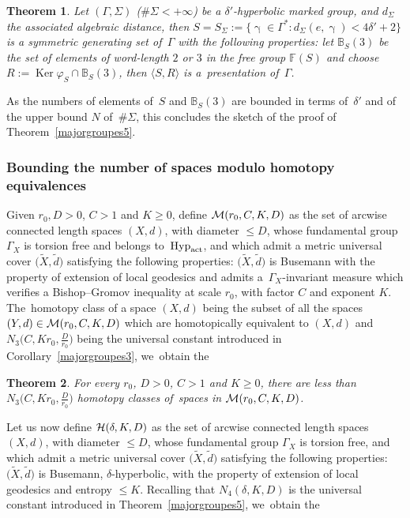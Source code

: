 \documentclass[pdftex]{sigma}
\numberwithin{equation}{section}
\newtheorem{theor}{Theorem}[section]
\newcommand{\Ker}{\operatorname{Ker}}
\newcommand{\g}{\operatorname{\gamma}}
\begin{document}
\begin{itemize}
\begin{theor}%
Let $(\Gamma, \Sigma)$ ($\#\Sigma <+\infty$) be a $\delta'$-hyperbolic marked group, and $d_\Sigma$ the associated algebraic distance,
then $S = S_\Sigma := \{\g \in \Gamma^*\colon d_\Sigma (e, \g) < 4 \delta' + 2 \}$ is a symmetric generating set of~$\Gamma$ with the following properties: let $\mathbb B_S (3)$ be the set of elements of word-length $2$ or $ 3$ in the free group $\mathbb F(S)$
and choose $R := \Ker \varphi_S \cap \mathbb B_S (3)$, then $\langle S, R\rangle$ is a~pre\-sentation of~$\Gamma$.
\end{theor}

As the numbers of elements of~$S$ and $\mathbb B_S (3)$ are bounded in terms of~$\delta'$ and of the upper bound $N$ of~$\# \Sigma$, this concludes the sketch of the proof of Theorem~\ref{majorgroupes5}.
\end{itemize}

\subsubsection{Bounding the number of spaces modulo homotopy equivalences}%

Given $r_0, D >0$, $C > 1$ and $K\ge 0$, define ${\cal M} (r_0, C, K,
D)$ as the set of arcwise connected length spaces $(X,d)$, with diameter $\le D$, whose
fundamental group $\Gamma_X$ is torsion free and belongs to~${\rm Hyp}_{\rm act}$, and which admit a metric universal cover $\big(\widetilde X, \tilde d\big)$
satisfying the following properties: $\big(\widetilde X, \tilde d\big)$ is Busemann with the property of extension of local geodesics and admits a~$\Gamma_X$-invariant
measure which verifies a Bishop--Gromov inequality at scale $r_0$, with factor $C$ and exponent $K$. The~homotopy class of a space $(X,d)$ being the subset
of all the spaces $(Y,d) \in {\cal M} (r_0, C, K, D)$ which are homotopically equivalent to $(X,d)$ and
$N_3 \big(C, K r_0, \frac{D}{r_0}\big)$ being the universal constant introduced in Corollary~\ref{majorgroupes3}, we~obtain the

\begin{theor}\label{boundhomotopies1}
For every $r_0$, $D >0$, $C > 1$ and $K\ge 0$, there are less than $N_3 \big(C, K r_0, \frac{D}{r_0}\big)$ homotopy classes of~spaces in ${\cal M} (r_0, C, K, D)$.
\end{theor}

Let us now define ${\cal H} (\delta, K, D)$ as the set of arcwise connected length spaces $(X,d)$, with diameter $\le D$, whose
fundamental group $\Gamma_X$ is torsion free, and which admit a metric universal cover $\big(\widetilde X, \tilde d\big)$
satisfying the following properties: $\big(\widetilde X, \tilde d\big)$ is Busemann, $\delta$-hyperbolic, with the property of extension of local geodesics and
entropy $\le K$. Recalling that $N_4 \left(\delta, K, D \right)$ is the universal constant introduced in Theorem~\ref{majorgroupes5}, we~obtain the
\end{document}
